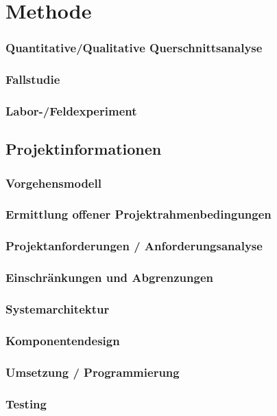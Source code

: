 \chapter{Methode}
\subsection{Quantitative/Qualitative Querschnittsanalyse}

\subsection{Fallstudie}

\subsection{Labor-/Feldexperiment}

\section{Projektinformationen}

\subsection{Vorgehensmodell}

\subsection{Ermittlung offener Projektrahmenbedingungen}
\label{ch:evaluation}

\subsection{Projektanforderungen / Anforderungsanalyse}
\label{sub:Anforderungen}

\subsection{Einschränkungen und Abgrenzungen}

\subsection{Systemarchitektur}

\subsection{Komponentendesign}

\subsection{Umsetzung / Programmierung}

\subsection{Testing}
